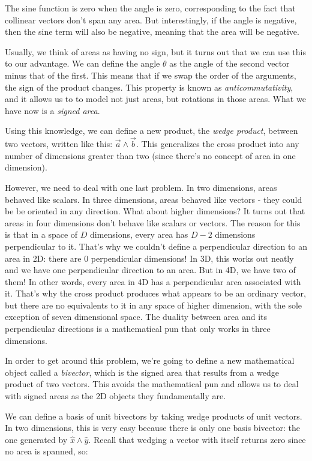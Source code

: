 The sine function is zero when the angle is zero, corresponding to the fact that collinear vectors
don't span any area. But interestingly, if the angle is negative, then the sine term will also be
negative, meaning that the area will be negative.

Usually, we think of areas as having no sign, but it turns out that we can use this to our
advantage. We can define the angle $\theta$ as the angle of the second vector minus that of the
first. This means that if we swap the order of the arguments, the sign of the product changes.
This property is known as \textit{anticommutativity}, and it allows us to to model not just areas,
but rotations in those areas. What we have now is a \textit{signed area}.

Using this knowledge, we can define a new product, the \textit{wedge product}, between two vectors,
written like this: $\vec{a} \wedge \vec{b}$. This generalizes the cross product into any number of
dimensions greater than two (since there's no concept of area in one dimension). 

However, we need to deal with one last problem. In two dimensions, areas behaved like scalars. In
three dimensions, areas behaved like vectors - they could be be oriented in any direction. What 
about higher dimensions? It turns out that areas in four dimensions don't behave like scalars or 
vectors. The reason for this is that in a space of $D$ dimensions, every area has $D - 2$ 
dimensions perpendicular to it. That's why we couldn't define a perpendicular direction to an area
in 2D: there are 0 perpendicular dimensions! In 3D, this works out neatly and we have one 
perpendicular direction to an area. But in 4D, we have two of them! In other words, every area in
4D has a perpendicular area associated with it. That's why the cross product produces what appears
to be an ordinary vector, but there are no equivalents to it in any space of higher dimension, with
the sole exception of seven dimensional space. The duality between area and its perpendicular
directions is a mathematical pun that only works in three dimensions.

In order to get around this problem, we're going to define a new mathematical object called a
\textit{bivector}, which is the signed area that results from a wedge product of two vectors. This
avoids the mathematical pun and allows us to deal with signed areas as the 2D objects they 
fundamentally are.

We can define a basis of unit bivectors by taking wedge products of unit vectors. In two
dimensions, this is very easy because there is only one basis bivector: the one generated by 
$\hat{x} \wedge \hat{y}$. Recall that wedging a vector with itself returns zero since no area is
spanned, so:

